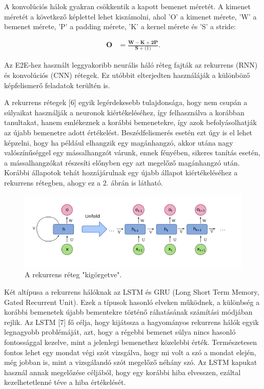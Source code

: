 A konvolúciós hálok gyakran csökkentik a kapott bemenet méretét. A kimenet méretét a következő képlettel lehet kiszámolni, ahol ’O’ a kimenet mérete, ’W’ a bemenet mérete, ’P’ a padding mérete, ’K’ a kernel mérete és ’S’ a stride:

\begin{align}
\mathbf{O}&=\frac{\mathbf{W}-\mathbf{K}+\mathbf{2P}}{\mathbf{S}+\mathbf(1)}.
\end{align}

Az E2E-hez használt leggyakoribb neurális háló réteg fajták az rekurrens (RNN) és konvolúciós (CNN) rétegek. Ez utóbbit elterjedten használáják a különböző képfelismerő feladatok terültén is.

A rekurrens rétegek [6] egyik legérdekesebb tulajdonsága, hogy nem csupán a súlyaikat használják a neuronok kiértékeléséhez, így felhasználva a korábban tanultakat, hanem emlékeznek a korábbi bemenetekre, így azok befolyásolhatják az újabb bemenetre adott értékelést. Beszédfelismerés esetén ezt úgy is el lehet képzelni, hogy ha például elhangzik egy magánhangzó, akkor utána nagy valószínűséggel egy mássalhangzót várunk, ennek fényében, sikeres tanítás esetén, a mássalhangzókat részesíti előnyben egy azt megelőző magánhangzó után. Korábbi állapotok tehát hozzájárulnak egy újabb állapot kiértékeléséhez a rekurrens rétegben, ahogy ez a 2. ábrán is látható.
 
\begin{figure}[!ht]
\centering
\includegraphics[width=150mm, keepaspectratio]{figures/rnn.png}
\caption{A rekurrens réteg "kigörgetve".}
\label{fig:TeXstudio}
\end{figure}


Két altípusa a rekurrens hálóknak az LSTM és GRU (Long Short Term Memory, Gated Recurrent Unit). Ezek a típusok hasonló elveken működnek, a különbség a korábbi bemenetek újabb bementekre történő ráhatásának számítási módjában rejlik. Az LSTM [7] fő célja, hogy kijátssza a hagyományos rekurrens hálók egyik legnagyobb problémáját, azt, hogy a régebbi bemenet súlya nincs hasonló fontossággal kezelve, mint a jelenlegi bemenethez közelebbi érték. Természetesen fontos lehet egy mondat végi szót vizsgálva, hogy mi volt a szó a mondat elején, még jobban is, mint a vizsgálandó szót megelőző néhány szó. Az LSTM kapukat használ annak megelőzése céljából, hogy egy korábbi hiba elvesszen, ezáltal kezelhetetlenné téve a hiba értékelését.

